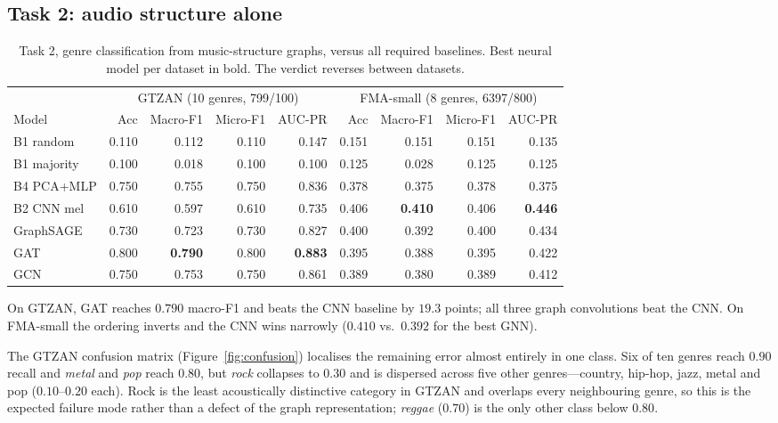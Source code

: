 \documentclass{article}
\begin{document}
\subsection{Task 2: audio structure alone}

\begin{table}[t]
\caption{Task 2, genre classification from music-structure graphs, versus all
required baselines. Best neural model per dataset in bold. The verdict reverses
between datasets.}
\label{tab:task2}
\centering
\small
\begin{tabular}{lrrrr|rrrr}
\toprule
& \multicolumn{4}{c|}{GTZAN (10 genres, 799/100)} & \multicolumn{4}{c}{FMA-small (8 genres, 6397/800)} \\
Model & Acc & Macro-F1 & Micro-F1 & AUC-PR & Acc & Macro-F1 & Micro-F1 & AUC-PR \\
\midrule
B1 random     & 0.110 & 0.112 & 0.110 & 0.147 & 0.151 & 0.151 & 0.151 & 0.135 \\
B1 majority   & 0.100 & 0.018 & 0.100 & 0.100 & 0.125 & 0.028 & 0.125 & 0.125 \\
B4 PCA+MLP    & 0.750 & 0.755 & 0.750 & 0.836 & 0.378 & 0.375 & 0.378 & 0.375 \\
B2 CNN mel    & 0.610 & 0.597 & 0.610 & 0.735 & 0.406 & \textbf{0.410} & 0.406 & \textbf{0.446} \\
\midrule
GraphSAGE     & 0.730 & 0.723 & 0.730 & 0.827 & 0.400 & 0.392 & 0.400 & 0.434 \\
GAT           & 0.800 & \textbf{0.790} & 0.800 & \textbf{0.883} & 0.395 & 0.388 & 0.395 & 0.422 \\
GCN           & 0.750 & 0.753 & 0.750 & 0.861 & 0.389 & 0.380 & 0.389 & 0.412 \\
\bottomrule
\end{tabular}
\end{table}

On GTZAN, GAT reaches $0.790$ macro-F1 and beats the CNN baseline by $19.3$
points; all three graph convolutions beat the CNN. On FMA-small the ordering
inverts and the CNN wins narrowly ($0.410$ vs.\ $0.392$ for the best GNN).

The GTZAN confusion matrix (Figure~\ref{fig:confusion}) localises the remaining
error almost entirely in one class. Six of ten genres reach $0.90$ recall and
\emph{metal} and \emph{pop} reach $0.80$, but \emph{rock} collapses to $0.30$ and
is dispersed across five other genres---country, hip-hop, jazz, metal and pop
($0.10$--$0.20$ each). Rock is the least acoustically distinctive category in
GTZAN and overlaps every neighbouring genre, so this is the expected failure mode
rather than a defect of the graph representation; \emph{reggae} ($0.70$) is the
only other class below $0.80$.
\end{document}
